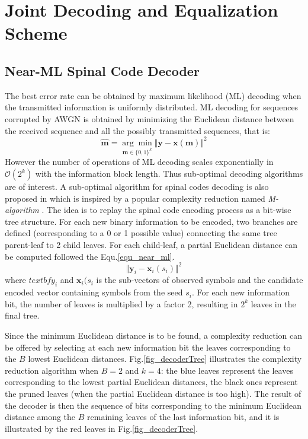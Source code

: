 \documentclass[conference]{IEEEtran}
\begin{document}
\section{Joint Decoding and Equalization Scheme} \label{sec:jointEqualization}

\subsection{Near-ML Spinal Code Decoder} \label{sec:nearML}
The best error rate can be obtained by maximum likelihood (ML) decoding when the transmitted information is uniformly distributed.
ML decoding for sequences corrupted by AWGN is obtained by minimizing the Euclidean distance between the received sequence and all the possibly transmitted sequences, that is:
\begin{equation}
\widehat{\bm m}=\underset{{\bm m}\in\{0,1\}^k}{\arg\min}\Vert{\bm y}-{\bm x}({\bm m})\Vert^2
\label{equ_ml}
\end{equation}
However the number of operations of ML decoding scales exponentially in $\mathcal{O}(2^k)$ with the information block length. Thus sub-optimal decoding algorithms are of interest. A sub-optimal algorithm for spinal codes decoding is also proposed in \cite{perry2012spinal} which is inspired by a popular complexity reduction named \emph{M-algorithm} \cite{Anderson1984}. The idea is to replay the spinal code encoding process as a bit-wise tree structure. For each new binary information to be encoded, two branches are defined (corresponding to a 0 or 1 possible value) connecting the same tree parent-leaf to 2 child leaves. For each child-leaf, a partial Euclidean distance can be computed followed the Equ.\ref{equ_near_ml}. 
\begin{equation}
\Vert\textbf{y}_{i}-\textbf{x}_{i}(s_{i})\Vert^2
\label{equ_near_ml}
\end{equation}
where $textbf{y}_{i}$ and $\textbf{x}_{i}(s_{i}$ is the sub-vectors of observed symbols and the candidate encoded vector containing symbols from the seed $s_i$.
For each new information bit, the number of leaves is multiplied by a factor 2, resulting in $2^k$ leaves in the final tree.

Since the minimum Euclidean distance is to be found, a complexity reduction can be offered by selecting at each new information bit the leaves corresponding to the $B$ lowest Euclidean distances. Fig.\ref{fig_decoderTree} illustrates the complexity reduction algorithm when $B=2$ and $k=4$: the blue leaves represent the leaves corresponding to the lowest partial Euclidean distances, the black ones represent the pruned leaves (when the partial Euclidean distance is too high). The result of the decoder is then the sequence of bits corresponding to the minimum Euclidean distance among the $B$ remaining leaves of the last information bit, and it is illustrated by the red leaves in Fig.\ref{fig_decoderTree}.
\end{document}
